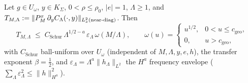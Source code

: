 \begin{theorem}[(D4): the frequency-transfer matrix, $\beta=\tfrac12$ proved;
$S4a$]\label{an17:S4a-D4}
Let $g\in U_\omega$, $y\in K_\Sigma$, $0<\rho\le\rho_0$, $|e|=1$, $\Lambda\ge1$,
and $T_{M,\Lambda}:=\|P^x_M\,\partial_yC_\Lambda(\cdot,y)\|_{L^2_x(\mathrm{near\text-
diag})}$. Then
\begin{equation}\label{an17:eq-D4}
 T_{M,\Lambda}\;\le\;C_{\mathrm{Schur}}\,\Lambda^{1/2-a}\,\varepsilon_\Lambda\,
 \omega(M/\Lambda),\qquad
 \omega(u)=\begin{cases}u^{1/2}, & 0<u\le c_{\mathrm{geo}},\\ 0, & u>c_{\mathrm{geo}},\end{cases}
\end{equation}
with $C_{\mathrm{Schur}}$ ball-uniform over $U_\omega$ (independent of
$M,\Lambda,y,e,h$), the transfer exponent $\beta=\tfrac12$, and
$\varepsilon_\Lambda=\Lambda^{a}\|h_\Lambda\|_{L^2}$ the $H^a$ frequency envelope
($\sum_\Lambda\varepsilon_\Lambda^2\le\|h\|_{H^a}^2$).
\end{theorem}
